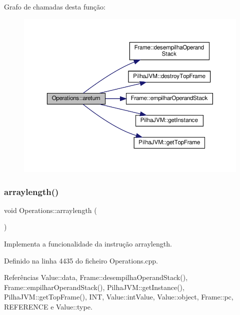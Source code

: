 Grafo de chamadas desta função\+:
\nopagebreak
\begin{figure}[H]
\begin{center}
\leavevmode
\includegraphics[width=350pt]{classOperations_a5829421b72f92d50dea0461953b26c5b_cgraph}
\end{center}
\end{figure}
\mbox{\label{classOperations_ae01c8bce2d6a583151dc0e46d1b8d52f}} 
\subsubsection{\texorpdfstring{arraylength()}{arraylength()}}
{\footnotesize\ttfamily void Operations\+::arraylength (\begin{DoxyParamCaption}{ }\end{DoxyParamCaption})\hspace{0.3cm}{\ttfamily [private]}}



Implementa a funcionalidade da instrução arraylength. 



Definido na linha 4435 do ficheiro Operations.\+cpp.



Referências Value\+::data, Frame\+::desempilha\+Operand\+Stack(), Frame\+::empilhar\+Operand\+Stack(), Pilha\+J\+V\+M\+::get\+Instance(), Pilha\+J\+V\+M\+::get\+Top\+Frame(), I\+NT, Value\+::int\+Value, Value\+::object, Frame\+::pc, R\+E\+F\+E\+R\+E\+N\+CE e Value\+::type.



